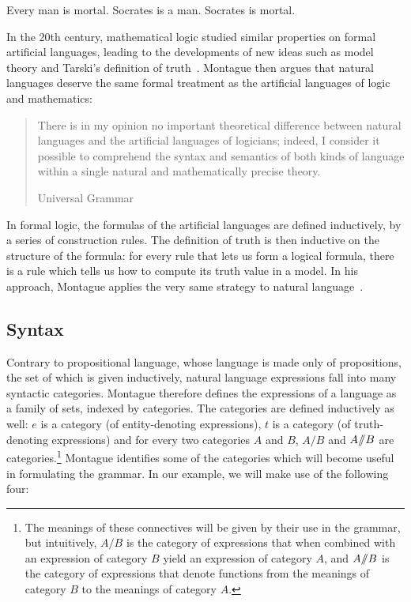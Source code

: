 \begin{exe}
  \ex Every man is mortal. Socrates is a man. \label{ex:syllogism-hypothesis}
  \ex Socrates is mortal. \label{ex:syllogism-conclusion}
\end{exe}

In the 20th century, mathematical logic studied similar properties on
formal artificial languages, leading to the developments of new ideas such
as model theory and Tarski's definition of
truth~\cite{sep-tarski-truth,tarski1986arithmetical}. Montague then argues
that natural languages deserve the same formal treatment as the artificial
languages of logic and mathematics:

\begin{quote}
  There is in my opinion no important theoretical difference between
  natural languages and the artificial languages of logicians; indeed, I
  consider it possible to comprehend the syntax and semantics of both kinds
  of language within a single natural and mathematically precise theory.

  \begin{flushright}
  Universal Grammar~\cite{montague1970universal}
  \end{flushright}
\end{quote}

In formal logic, the formulas of the artificial languages are defined
inductively, by a series of construction rules. The definition of truth is
then inductive on the structure of the formula: for every rule that lets us
form a logical formula, there is a rule which tells us how to compute its
truth value in a model. In his approach, Montague applies the very same
strategy to natural language~\cite{montague1973proper}.


\subsection{Syntax}
\label{ssec:montague-syntax}

Contrary to propositional language, whose language is made only of
propositions, the set of which is given inductively, natural language
expressions fall into many syntactic categories. Montague therefore defines
the expressions of a language as a family of sets, indexed by
categories. The categories are defined inductively as well: $e$ is a
category (of entity-denoting expressions), $t$ is a category (of
truth-denoting expressions) and for every two categories $A$ and $B$,
$A / B$ and $A /\!\!/ B$ are categories.\footnote{The meanings of
  these connectives will be given by their use in the grammar, but
  intuitively, $A / B$ is the category of expressions that when combined
  with an expression of category $B$ yield an expression of category $A$,
  and $A /\!\!/ B$ is the category of expressions that denote
  functions from the meanings of category $B$ to the meanings of category
  $A$.}  Montague identifies some of the categories which will become
useful in formulating the grammar. In our example, we will make use of the
following four:

